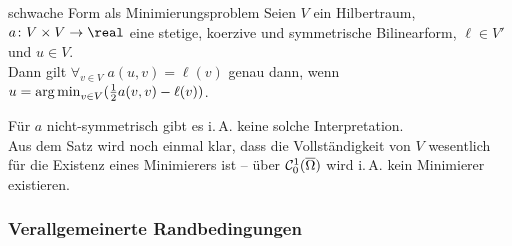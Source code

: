 \linie

\begin{Satz}{schwache Form als Minimierungsproblem}
    Seien $V$ ein Hilbertraum, $a\colon V \times V \to \real$ eine stetige, koerzive und
    symmetrische Bilinearform, $\ell \in V'$ und $u \in V$.\\
    Dann gilt $\forall_{v \in V}\; a(u, v) = \ell(v)$ genau dann, wenn
    $u = \operatorname{arg\,min}_{v \in V} (\frac{1}{2} a(v, v) - \ell(v))$.
\end{Satz}

\begin{Bem}
    Für $a$ nicht-symmetrisch gibt es i.\,A. keine solche Interpretation.\\
    Aus dem Satz wird noch einmal klar, dass die Vollständigkeit von $V$ wesentlich für
    die Existenz eines Minimierers ist --
    über $\mathcal{C}^1_0(\overline{\Omega})$ wird i.\,A. kein Minimierer existieren.
\end{Bem}

\pagebreak

\subsubsection{%
    Verallgemeinerte Randbedingungen%
}

